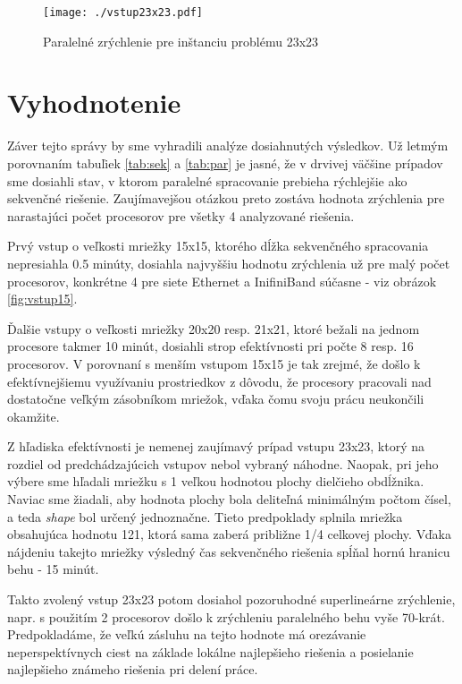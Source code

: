 \documentclass[slovak]{article}
\begin{document}
	\begin{figure}[!h]\centering
	\texttt{[image: ./vstup23x23.pdf]}
	\caption{Paralelné zrýchlenie pre inštanciu problému 23x23}\label{fig:vstup23}
	\end{figure}

\section{Vyhodnotenie}

	Záver tejto správy by sme vyhradili analýze dosiahnutých výsledkov. Už letmým porovnaním tabuľiek \ref{tab:sek} a \ref{tab:par} je jasné, že v drvivej väčšine prípadov sme dosiahli stav, v ktorom paralelné spracovanie prebieha rýchlejšie ako sekvenčné riešenie. Zaujímavejšou otázkou preto zostáva hodnota zrýchlenia pre narastajúci počet procesorov pre všetky 4 analyzované riešenia.

	Prvý vstup o veľkosti mriežky 15x15, ktorého dĺžka sekvenčného spracovania nepresiahla 0.5 minúty, dosiahla najvyššiu hodnotu zrýchlenia už pre malý počet procesorov, konkrétne 4 pre siete Ethernet a InifiniBand súčasne - viz obrázok \ref{fig:vstup15}.
	
	Ďalšie vstupy o veľkosti mriežky 20x20 resp. 21x21, ktoré bežali na jednom procesore takmer 10 minút, dosiahli strop efektívnosti pri počte 8 resp. 16 procesorov. V porovnaní s menším vstupom 15x15 je tak zrejmé, že došlo k efektívnejšiemu využívaniu prostriedkov z dôvodu, že procesory pracovali nad dostatočne veľkým zásobníkom mriežok, vďaka čomu svoju prácu neukončili okamžite.
	
	Z hľadiska efektívnosti je nemenej zaujímavý prípad vstupu 23x23, ktorý na rozdiel od predchádzajúcich vstupov nebol vybraný náhodne. Naopak, pri jeho výbere sme hľadali mriežku s 1 veľkou hodnotou plochy dielčieho obdĺžnika. Naviac sme žiadali, aby hodnota plochy bola deliteľná minimálným počtom čísel, a teda \emph{shape} bol určený jednoznačne. Tieto predpoklady splnila mriežka obsahujúca hodnotu 121, ktorá sama zaberá približne 1/4 celkovej plochy. Vďaka nájdeniu takejto mriežky výsledný čas sekvenčného riešenia spĺňal hornú hranicu behu - 15 minút.
	
	Takto zvolený vstup 23x23 potom dosiahol pozoruhodné superlineárne zrýchlenie, napr. s použitím 2 procesorov došlo k zrýchleniu paralelného behu vyše 70-krát. Predpokladáme, že veľkú zásluhu na tejto hodnote má orezávanie neperspektívnych ciest na základe lokálne najlepšieho riešenia a posielanie najlepšieho známeho riešenia pri delení práce.
	
\end{document}
